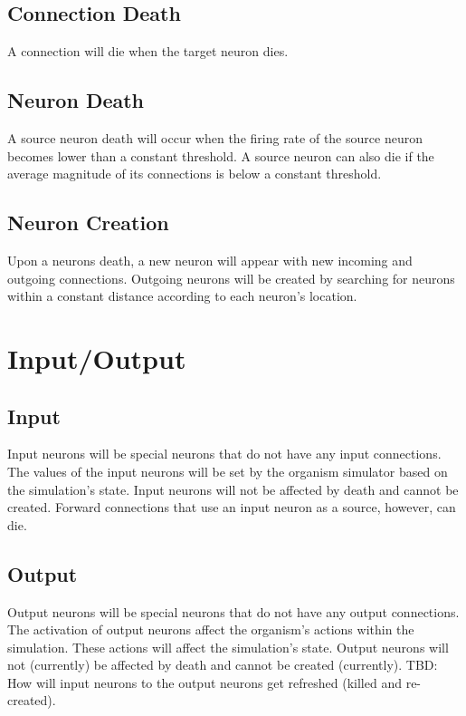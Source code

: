 \documentclass{article} %
\begin{document}
        \subsection{Connection Death}
            A connection will die when the target neuron dies.
        
        \subsection{Neuron Death}
            A source neuron death will occur when the firing rate of the source neuron becomes lower than a constant threshold. A source neuron can also die if the average magnitude of its connections is below a constant threshold.
        
        \subsection{Neuron Creation}
            Upon a neurons death, a new neuron will appear with new incoming and outgoing connections. Outgoing neurons will be created by searching for neurons within a constant distance according to each neuron's location.
    

    \section{Input/Output}
        
        \subsection{Input}
            Input neurons will be special neurons that do not have any input connections. The values of the input neurons will be set by the organism simulator based on the simulation's state. Input neurons will not be affected by death and cannot be created. Forward connections that use an input neuron as a source, however, can die.
        
        \subsection{Output}
            Output neurons will be special neurons that do not have any output connections. The activation of output neurons affect the organism's actions within the simulation. These actions will affect the simulation's state. Output neurons will not (currently) be affected by death and cannot be created (currently). TBD: How will input neurons to the output neurons get refreshed (killed and re-created).
\end{document}
